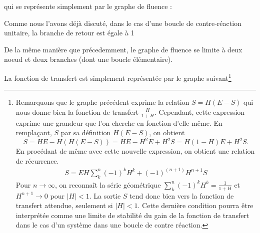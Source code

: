 qui se représente simplement par le graphe de fluence :
\begin{center}
\end{center}
Comme nous l'avons déjà discuté, dans le cas d'une boucle 
de contre-réaction unitaire, la branche de retour est égale à 1
\begin{center}
\end{center}
De la même manière que précedemment, le graphe de fluence se limite à 
deux noeud et deux branches (dont une boucle élémentaire).
\begin{center}
\end{center}
La fonction de transfert est simplement représentée par le graphe 
suivant\footnote{Remarquons que le graphe précédent exprime la relation 
$S=H(E-S)$ qui nous donne bien la fonction de transfert $\frac{H}{1+H}$. 
Cependant, cette expression exprime une grandeur que l'on cherche en fonction 
d'elle même. En remplaçant, $S$ par sa définition $H(E-S)$, on obtient
$$S=HE-H(H(E-S))=HE-H^2E+H^2S=H(1-H)E+H^2S.$$ En procédant de même avec 
cette nouvelle expression, on obtient une relation de récurrence. 
\begin{align*}
    S=EH\sum_k^n (-1)^kH^k+(-1)^{(n+1)}H^{n+1}S
\end{align*}
Pour $n\rightarrow\infty$, on reconnaît la série géométrique 
$\sum_k^n(-1)^kH^k=\frac{1}{1+H}$ et $H^{n+1}\rightarrow 0$ pour $|H|<1$.
La sortie $S$ tend donc bien vers la fonction de transfert attendue, 
seulement si $|H|<1$. Cette dernière condition pourra être interprétée 
comme une limite de stabilité du gain de la fonction de transfert dans 
le cas d'un système dans une boucle de contre réaction.}
\begin{center}
\end{center}

